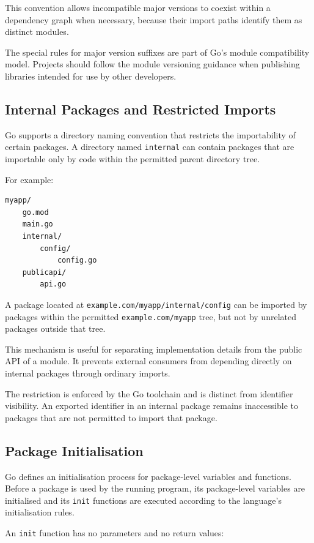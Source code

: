 This convention allows incompatible major versions to coexist within a dependency graph when necessary, because their import paths identify them as distinct modules.

The special rules for major version suffixes are part of Go's module compatibility model. Projects should follow the module versioning guidance when publishing libraries intended for use by other developers.

\subsection{Internal Packages and Restricted Imports}

Go supports a directory naming convention that restricts the importability of certain packages. A directory named \texttt{internal} can contain packages that are importable only by code within the permitted parent directory tree.

For example:

\begin{lstlisting}
myapp/
    go.mod
    main.go
    internal/
        config/
            config.go
    publicapi/
        api.go
\end{lstlisting}

A package located at \texttt{example.com/myapp/internal/config} can be imported by packages within the permitted \texttt{example.com/myapp} tree, but not by unrelated packages outside that tree.

This mechanism is useful for separating implementation details from the public API of a module. It prevents external consumers from depending directly on internal packages through ordinary imports.

The restriction is enforced by the Go toolchain and is distinct from identifier visibility. An exported identifier in an internal package remains inaccessible to packages that are not permitted to import that package.

\subsection{Package Initialisation}

Go defines an initialisation process for package-level variables and functions. Before a package is used by the running program, its package-level variables are initialised and its \texttt{init} functions are executed according to the language's initialisation rules.

An \texttt{init} function has no parameters and no return values:

